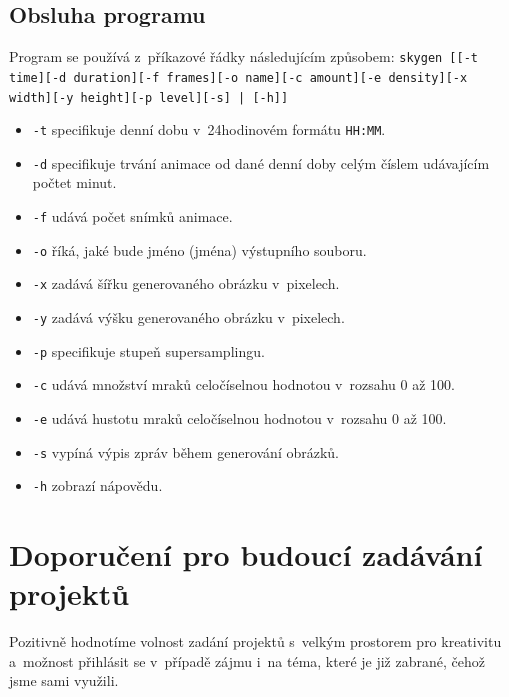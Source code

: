 \documentclass[12pt,a4paper,titlepage,final]{report}
\begin{document}
\section{Obsluha programu}

Program se používá z~příkazové řádky následujícím způsobem:
{\tt skygen [[-t time][-d duration][-f frames][-o name][-c amount][-e density][-x width][-y height][-p level][-s] | [-h]]}

\begin{itemize}
\item {\tt -t} specifikuje denní dobu v~24hodinovém formátu {\tt HH:MM}.
\item {\tt -d} specifikuje trvání animace od dané denní doby celým číslem udávajícím počtet minut.
\item {\tt -f} udává počet snímků animace.
\item {\tt -o} říká, jaké bude jméno (jména) výstupního souboru.
\item {\tt -x} zadává šířku generovaného obrázku v~pixelech.
\item {\tt -y} zadává výšku generovaného obrázku v~pixelech.
\item {\tt -p} specifikuje stupeň supersamplingu.
\item {\tt -c} udává množství mraků celočíselnou hodnotou v~rozsahu 0 až 100.
\item {\tt -e} udává hustotu mraků celočíselnou hodnotou v~rozsahu 0 až 100.
\item {\tt -s} vypíná výpis zpráv během generování obrázků.
\item {\tt -h} zobrazí nápovědu.
\end{itemize}

\chapter{Doporučení pro budoucí zadávání projektů}

Pozitivně hodnotíme volnost zadání projektů s~velkým prostorem pro
kreativitu a~možnost přihlásit se v~případě zájmu i~na téma, které je již
zabrané, čehož jsme sami využili.




\nocite{cite1}
\nocite{cite2}
\nocite{cite3}


\end{document}
